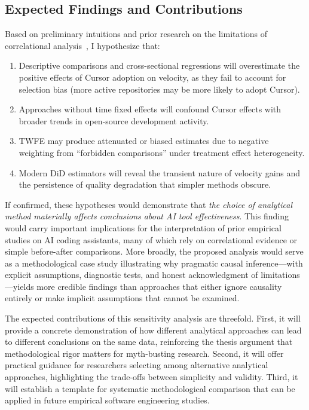 \subsection{Expected Findings and Contributions}

Based on preliminary intuitions and prior research on the limitations of correlational analysis~\cite{DBLP:journals/toplas/BergerHMVV19}, I hypothesize that:
\begin{enumerate}[leftmargin=15pt]
    \item Descriptive comparisons and cross-sectional regressions will overestimate the positive effects of Cursor adoption on velocity, as they fail to account for selection bias (more active repositories may be more likely to adopt Cursor).
    \item Approaches without time fixed effects will confound Cursor effects with broader trends in open-source development activity.
    \item TWFE may produce attenuated or biased estimates due to negative weighting from ``forbidden comparisons'' under treatment effect heterogeneity.
    \item Modern DiD estimators will reveal the transient nature of velocity gains and the persistence of quality degradation that simpler methods obscure.
\end{enumerate}

If confirmed, these hypotheses would demonstrate that \emph{the choice of analytical method materially affects conclusions about AI tool effectiveness}.
This finding would carry important implications for the interpretation of prior empirical studies on AI coding assistants, many of which rely on correlational evidence or simple before-after comparisons.
More broadly, the proposed analysis would serve as a methodological case study illustrating why pragmatic causal inference---with explicit assumptions, diagnostic tests, and honest acknowledgment of limitations---yields more credible findings than approaches that either ignore causality entirely or make implicit assumptions that cannot be examined.

The expected contributions of this sensitivity analysis are threefold.
First, it will provide a concrete demonstration of how different analytical approaches can lead to different conclusions on the same data, reinforcing the thesis argument that methodological rigor matters for myth-busting research.
Second, it will offer practical guidance for researchers selecting among alternative analytical approaches, highlighting the trade-offs between simplicity and validity.
Third, it will establish a template for systematic methodological comparison that can be applied in future empirical software engineering studies.
